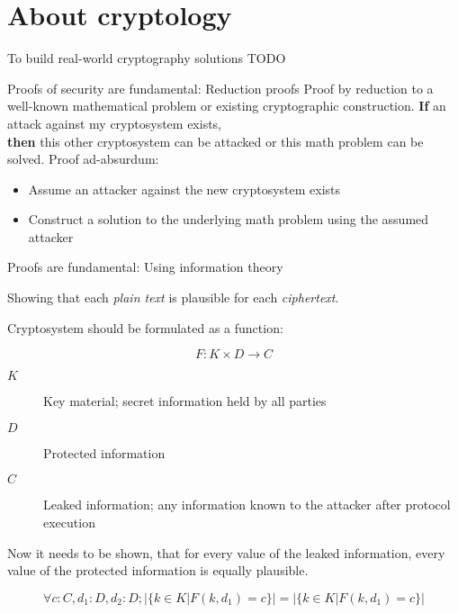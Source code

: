 \section{About cryptology}

\begin{frame}{To build real-world cryptography solutions}
  TODO
\end{frame}

\begin{frame}{Proofs of security are fundamental: Reduction proofs}
  \small
  Proof by reduction to a well-known mathematical problem or existing cryptographic construction.
  \vfill
  \textbf{If} an attack against my cryptosystem exists,
  \\ \textbf{then} this other cryptosystem can be attacked or this math problem can be solved.
  \vfill
  Proof ad-absurdum:
  \begin{itemize}
    \item Assume an attacker against the new cryptosystem exists
    \item Construct a solution to the underlying math problem using the assumed attacker
  \end{itemize}
\end{frame}

\begin{frame}{Proofs are fundamental: Using information theory}
  \small

  Showing that each \emph{plain text} is plausible for each \emph{ciphertext}.

  \vfill

  Cryptosystem should be formulated as a function:

  $$F : K \times D \to C$$

  \begin{description}
    \item[$K$] Key material; secret information held by all parties
    \item[$D$] Protected information
    \item[$C$] Leaked information; any information known to the attacker after protocol execution
  \end{description}

  Now it needs to be shown, that for every value of the leaked information,
  every value of the protected information is equally plausible.


  $$\forall c : C, d_1 : D, d_2 : D; |\{ k \in K | F(k, d_1) = c \}| = |\{ k \in K | F(k, d_1) = c \}|$$
\end{frame}

